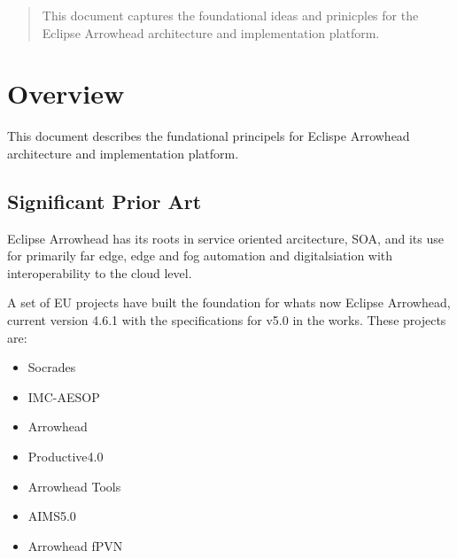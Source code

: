 \documentclass[a4paper]{arrowhead}
\begin{document}
\begin{center}
  \vspace*{1cm}
  \vspace*{\fill}

  \begin{abstract}
    This document captures the foundational ideas and prinicples for
    the Eclipse Arrowhead architecture and implementation platform. 
  \end{abstract}


 \end{center}

\newpage

\tableofcontents
\newpage

\section{Overview}
\label{sec:overview}
This document describes the fundational principels for Eclispe
Arrowhead architecture and implementation platform. 



\subsection{Significant Prior Art}
\label{sec:prior_art}

Eclipse Arrowhead has its roots in service oriented arcitecture, SOA,
and its use for primarily far edge, edge and fog automation and
digitalsiation with interoperability to the cloud level.

A set of EU projects have built the foundation for whats now Eclipse
Arrowhead, current version 4.6.1 with the specifications for v5.0 in
the works. These projects are:
\begin{itemize}
\item Socrades
\item IMC-AESOP
\item Arrowhead
\item Productive4.0
\item Arrowhead Tools
\item AIMS5.0
\item Arrowhead fPVN
\end{itemize}
\end{document}
